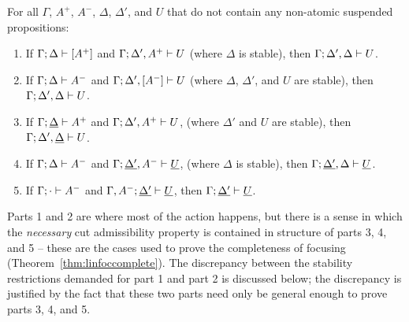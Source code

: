 \bigskip
\begin{theorem}\label{thm:lincut}
For all $\Gamma$, $A^+$, $A^-$, $\Delta$, $\Delta'$, and $U$ that
do not contain any non-atomic suspended propositions:
\begin{enumerate}
\item If ${\Gamma};{\Delta} \vdash {[A^+]} \mathstrut$
      and ${\Gamma};{\Delta',A^+} \vdash {U} \mathstrut$
      (where $\Delta$ is stable), 
      then ${\Gamma};{\Delta',\Delta} \vdash {U} \mathstrut$.
\item If ${\Gamma};{\Delta} \vdash {A^-} \mathstrut$
      and ${\Gamma};{\Delta', [A^-]} \vdash {U} \mathstrut$
      (where $\Delta$, $\Delta'$, and $U$ are stable),
      then ${\Gamma};{\Delta',\Delta} \vdash {U} \mathstrut$. 
\item If ${\Gamma};{\underline{\Delta}} \vdash {A^+} \mathstrut$
      and ${\Gamma};{\Delta', A^+} \vdash {U} \mathstrut$,
      (where $\Delta'$ and $U$ are stable),
      then ${\Gamma};{\Delta',\underline{\Delta}} \vdash {U} \mathstrut$. 
\item If ${\Gamma};{\Delta} \vdash {A^-} \mathstrut$
      and ${\Gamma};{\underline{\Delta'}, A^-} \vdash {\underline{U}} \mathstrut$,
      (where $\Delta$ is stable),
      then ${\Gamma};{\underline{\Delta'},\Delta} \vdash {\underline{U}} \mathstrut$. 
\item If ${\Gamma};{\cdot} \vdash {A^-} \mathstrut$
      and ${\Gamma, A^-};{\underline{\Delta'}} \vdash {\underline{U}} \mathstrut$,
      then ${\Gamma};{\underline{\Delta'}} \vdash {\underline{U}} \mathstrut$. 
\end{enumerate}
\end{theorem}
\bigskip

\noindent
Parts 1 and 2 are where most of the action happens, but there is a
sense in which the {\it necessary} cut admissibility property is
contained in structure of parts 3, 4, and 5 -- these are the cases
used to prove the completeness of focusing
(Theorem~\ref{thm:linfoccomplete}). The discrepancy between the
stability restrictions demanded for part 1 and part 2 is discussed
below; the discrepancy is justified by the fact that these two parts
need only be general enough to prove parts 3, 4, and 5.

